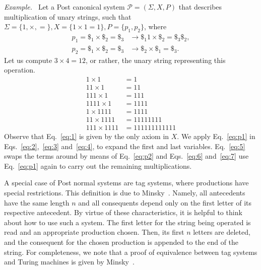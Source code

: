 \documentclass[12pt]{article}
\begin{document}
\emph{Example.~\cite[Problem 12-4.3]{Minsky:book:1967}} Let a Post canonical
system $\mathcal{P} = (\Sigma, X, P)$ that describes multiplication of unary
strings, such that $\Sigma = \{1, \times, =\}, X = \{1 \times 1 = 1\}, P =
\{p_{1}, p_{2}\}$, where
\begin{align}
    p_{1} = \$_{1} \times \$_{2} = \$_{3} &\rightarrow \$_{1}1 \times \$_{2}
        = \$_{3}\$_{2}, \label{eq:p1} \\
    p_{2} = \$_{1} \times \$_{2} = \$_{3} &\rightarrow \$_{2} \times \$_{1}
        = \$_{3}. \label{eq:p2}
\end{align}
Let us compute $3 \times 4 = 12$, or rather, the unary string representing this
operation.
\begin{align}
    1    \times 1    &= 1            \label{eq:1} \\
    11   \times 1    &= 11           \label{eq:2} \\
    111  \times 1    &= 111          \label{eq:3} \\
    1111 \times 1    &= 1111         \label{eq:4} \\
    1    \times 1111 &= 1111         \label{eq:5} \\
    11   \times 1111 &= 11111111     \label{eq:6} \\
    111  \times 1111 &= 111111111111 \label{eq:7}
\end{align}
Observe that Eq.~\ref{eq:1} is given by the only axiom in $X$. We apply
Eq.~\ref{eq:p1} in Eqs.~\ref{eq:2},~\ref{eq:3} and~\ref{eq:4}, to expand the
first and last variables. Eq.~\ref{eq:5} swaps the terms around by means of
Eq.~\ref{eq:p2} and Eqs.~\ref{eq:6} and~\ref{eq:7} use Eq.~\ref{eq:p1} again to
carry out the remaining multiplications.

A special case of Post normal systems are tag systems, where productions have
special restrictions. This definition is due to Minsky~\cite[Sec.
14.6]{Minsky:book:1967}. Namely, all antecedents have the same length $n$ and
all consequents depend only on the first letter of its respective antecedent.
By virtue of these characteristics, it is helpful to think about how to use
such a system. The first letter for the string being operated is read and an
appropriate production chosen. Then, its first $n$ letters are deleted, and the
consequent for the chosen production is appended to the end of the string. For
completeness, we note that a proof of equivalence between tag systems and
Turing machines is given by Minsky~\cite[Theorem 14.6-1]{Minsky:book:1967}.
\end{document}

